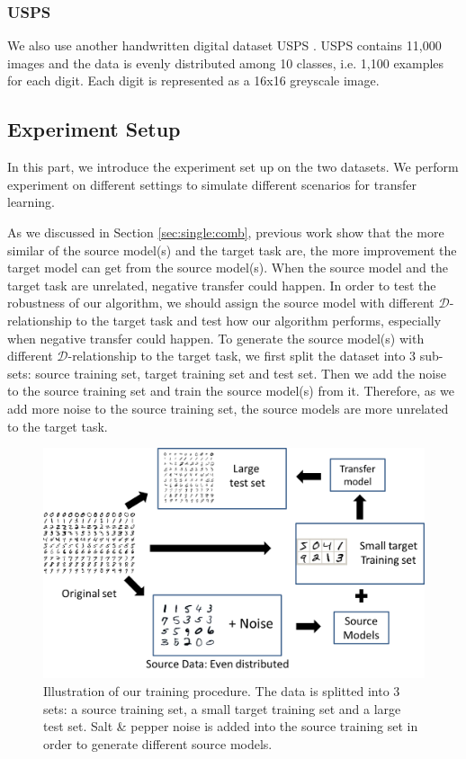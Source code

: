 \subsubsection{USPS}
We also use another handwritten digital dataset USPS \cite{hull1994database}. USPS contains 11,000 images and the data is evenly distributed among 10 classes, i.e. 1,100 examples for each digit. Each digit is represented as a 16x16 greyscale image.

\subsection{Experiment Setup}
In this part, we introduce the experiment set up on the two datasets. We perform experiment on different settings to simulate different scenarios for transfer learning. 

As we discussed in Section \ref{sec:single:comb}, previous work \cite{ben2010theory} show that the more similar of the source model(s) and the target task are, the more improvement the target model can get from the source model(s). When the source model and the target task are unrelated, negative transfer could happen. 
In order to test the robustness of our algorithm, we should assign the source model with different $\mathcal{D}$-relationship to the target task and test how our algorithm performs, especially when negative transfer could happen. To generate the source model(s) with different $\mathcal{D}$-relationship to the target task, we first split the dataset into 3 sub-sets: source training set, target training set and test set. Then we add the noise to the source training set and train the source model(s) from it. Therefore, as we add more noise to the source training set, the source models are more unrelated to the target task.

\begin{figure}\label{fig:single:split}
	\centering
	\includegraphics[scale=.7]{transfer/fig/split.png}
	\caption{Illustration of our training procedure. The data is splitted into 3 sets: a source training set, a small target training set and a large test set. Salt \& pepper noise is added into the source training set in order to generate different source models.}
\end{figure}

